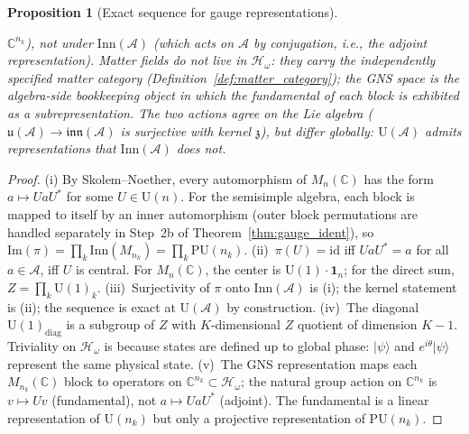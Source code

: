\documentclass[11pt]{article}
\newtheorem{proposition}[theorem]{Proposition}
\theoremstyle{definition}
\begin{document}
\begin{proposition}[Exact sequence for gauge representations]
\begin{enumerate}[label=(\roman*),nosep]
  $\mathbb{C}^{n_k}$), not under $\mathrm{Inn}(\mathcal{A})$ (which
  acts on $\mathcal{A}$ by conjugation, i.e., the adjoint
  representation).  Matter fields do \emph{not} live in
  $\mathcal{H}_\omega$: they carry the independently specified matter
  category (Definition~\ref{def:matter_category}); the GNS space is
  the algebra-side bookkeeping object in which the fundamental of each
  block is exhibited as a subrepresentation.
  The two actions agree on the Lie algebra
  ($\mathfrak{u}(\mathcal{A}) \to
  \mathfrak{inn}(\mathcal{A})$ is surjective with kernel
  $\mathfrak{z}$), but differ globally: $\mathrm{U}(\mathcal{A})$
  admits representations that $\mathrm{Inn}(\mathcal{A})$ does not.
\end{enumerate}
\end{proposition}

\begin{proof}
(i) By Skolem--Noether, every automorphism of $M_n(\mathbb{C})$ has
the form $a \mapsto UaU^*$ for some $U \in \mathrm{U}(n)$.  For the
semisimple algebra, each block is mapped to itself by an inner
automorphism (outer block permutations are handled separately in
Step~2b of Theorem~\ref{thm:gauge_ident}), so
$\mathrm{Im}(\pi) = \prod_k \mathrm{Inn}(M_{n_k}) = \prod_k
\mathrm{PU}(n_k)$.  (ii)~$\pi(U) = \mathrm{id}$ iff
$UaU^* = a$ for all $a \in \mathcal{A}$, iff $U$ is central.
For $M_n(\mathbb{C})$, the center is $\mathrm{U}(1) \cdot
\mathbf{1}_n$; for the direct sum, $Z = \prod_k \mathrm{U}(1)_k$.
(iii)~Surjectivity of $\pi$ onto $\mathrm{Inn}(\mathcal{A})$ is (i);
the kernel statement is (ii); the sequence is exact at
$\mathrm{U}(\mathcal{A})$ by construction.  (iv)~The diagonal
$\mathrm{U}(1)_{\mathrm{diag}}$ is a subgroup of $Z$ with
$K$-dimensional $Z$ quotient of dimension $K - 1$.  Triviality on
$\mathcal{H}_\omega$ is because states are defined up to global
phase: $|\psi\rangle$ and $e^{i\theta}|\psi\rangle$ represent the
same physical state.  (v)~The GNS representation maps each
$M_{n_k}(\mathbb{C})$ block to operators on $\mathbb{C}^{n_k}
\subset \mathcal{H}_\omega$; the natural group action on
$\mathbb{C}^{n_k}$ is $v \mapsto Uv$ (fundamental), not
$a \mapsto UaU^*$ (adjoint).  The fundamental is a linear
representation of $\mathrm{U}(n_k)$ but only a projective
representation of $\mathrm{PU}(n_k)$.
\end{proof}
\end{document}
